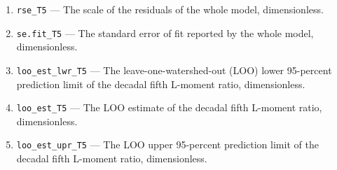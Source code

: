 \documentclass[1p, authoryear, 11pt, times, preprint]{elsarticle}
\newcommand{\code}[1]{{\color{black}%
                       \mbox{\lstinline[basicstyle={\small\ttfamily},
                                        keywordstyle=\scriptsize\ttfamily]|#1|}}}
\begin{document}
\begin{enumerate}
\item \code{rse_T5} --- The scale of the residuals of the whole model, dimensionless.
\item \code{se.fit_T5} --- The standard error of fit reported by the whole model, dimensionless.
\item \code{loo_est_lwr_T5} --- The leave-one-watershed-out (LOO) lower 95-percent prediction limit of the decadal fifth L-moment ratio, dimensionless.
\item \code{loo_est_T5} --- The LOO estimate of the decadal fifth L-moment ratio, dimensionless.
\item \code{loo_est_upr_T5} --- The LOO upper 95-percent prediction limit of the decadal fifth L-moment ratio, dimensionless.
\end{enumerate}


\end{document}
